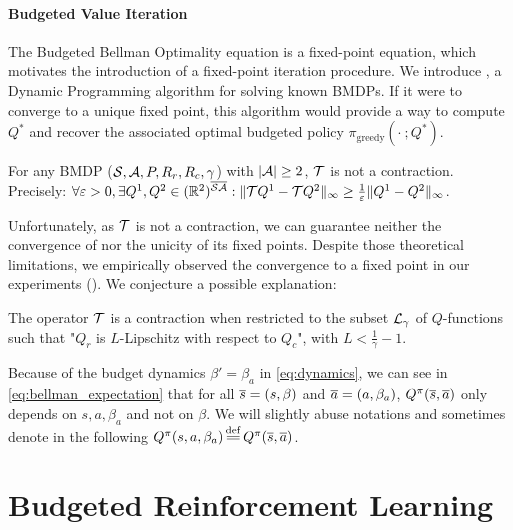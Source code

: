 \documentclass{article}
\begin{document}
\paragraph{Budgeted Value Iteration}

The Budgeted Bellman Optimality equation is a fixed-point equation, which motivates the introduction of a fixed-point iteration procedure. We introduce , a Dynamic Programming algorithm for solving known BMDPs. If it were to converge to a unique fixed point, this algorithm would provide a way to compute $Q^*$ and recover the associated optimal budgeted policy $\pi_\text{greedy}(\cdot~; Q^*)$.

\begin{theorem}
\label{thm:contraction}
For any BMDP ($\mathcal{S},\mathcal{A},P,R_r,R_c,\gamma$) with $|\mathcal{A}| \geq 2$, $\mathcal{T}$ is not a contraction. Precisely: $\forall\varepsilon>0, \exists Q^1,Q^2\in(\mathbb{R}^2)^{\overline{\mathcal{S}}\overline{\mathcal{A}}}:\|\mathcal{T} Q^1-\mathcal{T} Q^2\|_\infty \geq \frac{1}{\varepsilon}\|Q^1-Q^2\|_\infty$.
\end{theorem}

Unfortunately, as $\mathcal{T}$ is not a contraction, we can guarantee neither the convergence of  nor the unicity of its fixed points. Despite those theoretical limitations, we empirically observed the convergence to a fixed point in our experiments (). We conjecture a possible explanation:

\begin{theorem}
\label{rmk:contractivity-smooth}
The operator $\mathcal{T}$ is a contraction when restricted to the subset $\mathcal{L}_\gamma$ of $Q$-functions such that "$Q_r$ is $L$-Lipschitz with respect to $Q_c$", with $L<\frac{1}{\gamma}-1$. %
\end{theorem}

\begin{remark}
Because of the budget dynamics $\beta' = \beta_a$ in \eqref{eq:dynamics}, we can see in \eqref{eq:bellman_expectation} that for all $\overline{s}=(s, \beta)$ and $\overline{a}=(a, \beta_a)$, $Q^\pi(\overline{s}, \overline{a})$ only depends on $s, a, \beta_a$ and not on $\beta$. We will slightly abuse notations and sometimes denote in the following $Q^\pi(s, a, \beta_a) \eqdef Q^\pi(\os, \oa)$.
\end{remark}

\section{Budgeted Reinforcement Learning}
\label{sec:brl}
\end{document}
